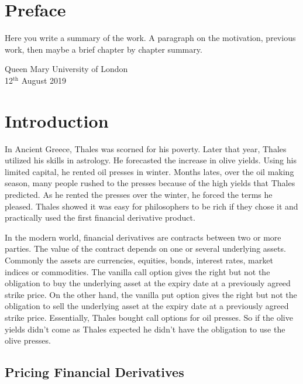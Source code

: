 \documentclass[12pt, oneside]{book}
\theoremstyle{plain}
\theoremstyle{definition}
\begin{document}
\chapter*{Preface}
Here  you write a summary of the work. A paragraph on the motivation, previous work, then maybe a brief chapter by chapter summary. 

\lipsum[100]%

\begin{flushright}
Queen Mary University of London\\
12${}^{\text{th}}$ August 2019
\end{flushright}

\tableofcontents

\chapter{Introduction}
In Ancient Greece, Thales was scorned for his poverty. Later that year, Thales utilized his skills in astrology. He forecasted the increase in olive yields. Using his limited capital, he rented oil presses in winter. Months lates, over the oil making season, many people rushed to the presses because of the high yields that Thales predicted. As he rented the presses over the winter, he forced the terms he pleased. Thales showed it was easy for philosophers to be rich if they chose it and practically used the first  financial derivative product. \cite{thalesians}

In the modern world, financial derivatives are contracts between two or more parties. The value of the contract depends on one or several underlying assets. Commonly the assets are currencies, equities, bonds, interest rates, market indices or commodities. The vanilla call option gives the right but not the obligation to buy the underlying asset at the expiry date at a previously agreed strike price.  On the other hand, the vanilla put option gives the right but not the obligation to sell the underlying asset at the expiry date at a previously agreed strike price. Essentially, Thales bought call options for oil presses.  So if the olive yields didn't come as Thales expected he didn't have the obligation to use the olive presses.

\section{Pricing Financial Derivatives}\label{Pricing Financial Derivatives}
\end{document}

